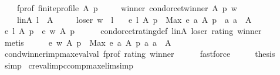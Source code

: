 \begin{isabellebody}
\ \ \ \ f{\isacharunderscore}{\kern0pt}prof{\isacharcolon}{\kern0pt}\ {\isachardoublequoteopen}finite{\isacharunderscore}{\kern0pt}profile\ A\ p{\isachardoublequoteclose}\ \isanewline
\ \ \ \ winner{\isacharcolon}{\kern0pt}\ {\isachardoublequoteopen}condorcet{\isacharunderscore}{\kern0pt}winner\ A\ p\ w{\isachardoublequoteclose}\ \isanewline
\ \ \ \ linA{\isacharcolon}{\kern0pt}\ {\isachardoublequoteopen}l\ {\isasymin}\ A{\isachardoublequoteclose}\ \isanewline
\ \ \ \ loser{\isacharcolon}{\kern0pt}\ {\isachardoublequoteopen}w\ {\isasymnoteq}\ l{\isachardoublequoteclose}\isanewline
\ \ \ {\isachardoublequoteopen}e\ l\ A\ p\ {\isacharless}{\kern0pt}\ Max\ {\isacharbraceleft}{\kern0pt}e\ a\ A\ p\ {\isacharbar}{\kern0pt}\ a{\isachardot}{\kern0pt}\ a\ {\isasymin}\ A{\isacharbraceright}{\kern0pt}{\isachardoublequoteclose}\isanewline
%
\isadelimproof
%
\endisadelimproof
%
\isatagproof
{}\isamarkupfalse%
\ {\isacharminus}{\kern0pt}\isanewline
\ \ \isamarkupfalse%
\ {\isachardoublequoteopen}e\ l\ A\ p\ {\isacharless}{\kern0pt}\ e\ w\ A\ p{\isachardoublequoteclose}\isanewline
\ \ \ \ \isamarkupfalse%
\ condorcet{\isacharunderscore}{\kern0pt}rating{\isacharunderscore}{\kern0pt}def\ linA\ loser\ rating\ winner\isanewline
\ \ \ \ \isamarkupfalse%
\ metis\isanewline
\ \ \isamarkupfalse%
\ \isamarkupfalse%
\ {\isachardoublequoteopen}e\ w\ A\ p\ {\isacharequal}{\kern0pt}\ Max\ {\isacharbraceleft}{\kern0pt}e\ a\ A\ p\ {\isacharbar}{\kern0pt}a{\isachardot}{\kern0pt}\ a\ {\isasymin}\ A{\isacharbraceright}{\kern0pt}{\isachardoublequoteclose}\isanewline
\ \ \ \ \isamarkupfalse%
\ cond{\isacharunderscore}{\kern0pt}winner{\isacharunderscore}{\kern0pt}imp{\isacharunderscore}{\kern0pt}max{\isacharunderscore}{\kern0pt}eval{\isacharunderscore}{\kern0pt}val\ f{\isacharunderscore}{\kern0pt}prof\ rating\ winner\isanewline
\ \ \ \ \isamarkupfalse%
\ fastforce\isanewline
\ \ \isamarkupfalse%
\ \isamarkupfalse%
\ {\isacharquery}{\kern0pt}thesis\isanewline
\ \ \ \ \isamarkupfalse%
\ simp\isanewline
{}\isamarkupfalse%
%
\endisatagproof
{\isafoldproof}%
%
\isadelimproof
\isanewline
%
\endisadelimproof
\isanewline
\isanewline
{}\isamarkupfalse%
\ cr{\isacharunderscore}{\kern0pt}eval{\isacharunderscore}{\kern0pt}imp{\isacharunderscore}{\kern0pt}ccomp{\isacharunderscore}{\kern0pt}max{\isacharunderscore}{\kern0pt}elim{\isacharbrackleft}{\kern0pt}simp{\isacharbrackright}{\kern0pt}{\isacharcolon}{\kern0pt}\isanewline

\end{isabellebody}
